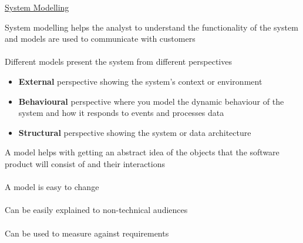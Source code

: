 \documentclass{article}[18pt]
\begin{document}
\begin{center}
\underline{\huge System Modelling}
\end{center}
System modelling helps the analyst to understand the functionality of the system and models are used to communicate with customers\\
\\
Different models present the system from different perspectives
\begin{itemize}
	\item \textbf{External} perspective showing the system's context or environment
	\item \textbf{Behavioural} perspective where you model the dynamic behaviour of the system and how it responds to events and processes data
	\item \textbf{Structural} perspective showing the system or data architecture
\end{itemize}
A model helps with getting an abstract idea of the objects that the software product will consist of and their interactions\\
\\
A model is easy to change\\
\\
Can be easily explained to non-technical audiences\\
\\
Can be used to measure against requirements
\end{document}

